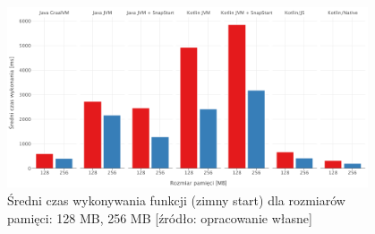 \begin{figure}[p] %
    \centering

    \includegraphics[width=0.95\textwidth]{charts/results/avg-cold-start-128-256.png}
    \caption{Średni czas wykonywania funkcji (zimny start) dla rozmiarów pamięci: 128 MB, 256 MB  [źródło: opracowanie własne]}
    \label{fig:avg_cold_start_128_256}

    \vspace{2em} %


\end{figure}
